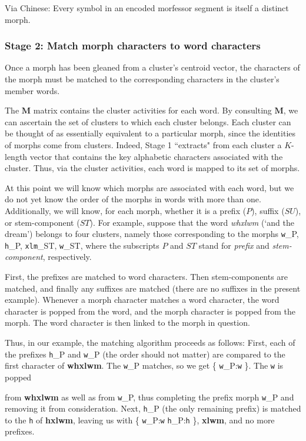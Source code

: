 Via Chinese: Every symbol in an encoded morfessor segment is itself a distinct morph.

\subsubsection{Stage 2: Match morph characters to word characters} Once a morph has been gleaned from a cluster's centroid vector, the characters of the morph must be matched to the corresponding characters in the cluster's member words. 

The $\mathbf{M}$ matrix contains the cluster activities for each word. By consulting $\mathbf{M}$, we can ascertain the set of clusters to
which each cluster belongs. Each cluster can be thought of as essentially equivalent to a particular morph, since the identities of morphs come from clusters. Indeed, Stage 1 ``extracts" from each cluster a $K$-length vector that  contains the key alphabetic characters associated with the cluster. Thus, via the cluster activities, each word is mapped to its set of morphs.

At this point we will know which morphs are associated with each word, but we do not yet know the order of the morphs in words with more than one. Additionally, we will know, for each morph, whether it is a prefix ($P$), suffix ($SU$), or stem-component ($ST$). For example, suppose that the word \textit{whxlwm} (`and the dream') belongs to four clusters, namely those corresponding to the morphs \texttt{w}_{P}, \texttt{h}_{P}, \texttt{xlm}_{ST}, \texttt{w}_{ST}, where the subscripts $P$ and $ST$ stand for \textit{prefix} and \textit{stem-component}, respectively.

First, the prefixes are matched to word characters. Then stem-components are matched, and finally any suffixes are matched (there are no suffixes in the present example). Whenever a morph character matches a word character, the word character is popped from the word, and the morph character is popped from the morph. The word character is then linked to the morph in question. 

Thus, in our example, the matching algorithm proceeds as follows: First, each of the prefixes \texttt{h}_{P} and \texttt{w}_{P} (the order should not matter) are compared to the first character of \textbf{whxlwm}. The \texttt{w}_{P} matches, so we get \{ \texttt{w}_{P}:\texttt{w} \}. The \texttt{w} is popped 

from \textbf{whxlwm} as well as from \texttt{w}_{P}, thus completing the prefix morph \texttt{w}_{P} and removing it from consideration. Next, \texttt{h}_{P} (the only remaining prefix) is matched to the \texttt{h} of \textbf{hxlwm}, leaving us with \{  \texttt{w}_{P}:\texttt{w} \texttt{h}_{P}:\texttt{h} \}, \textbf{xlwm}, and no more prefixes.

